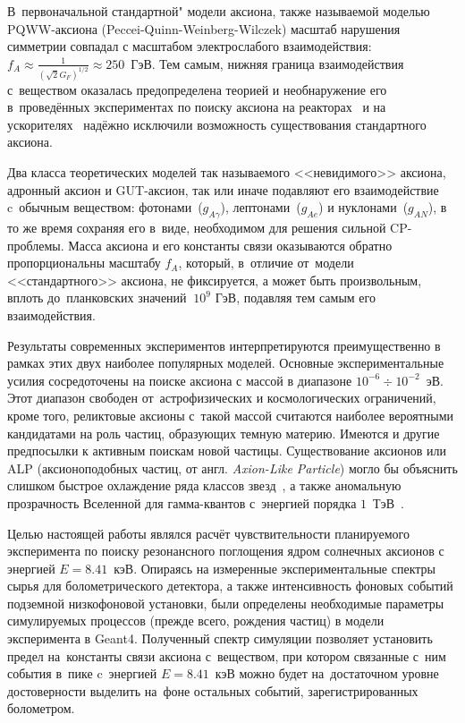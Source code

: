 \documentclass[a4paper,article,14pt]{extarticle}
\begin{document}
В~первоначальной стандартной" модели аксиона, также называемой моделью PQWW-аксиона (Peccei-Quinn-Weinberg-Wilczek) масштаб нарушения симметрии совпадал с масштабом электрослабого взаимодействия:
$f_A \approx \frac{1}{(\sqrt{2} G_F)^{1/2}} \approx 250$~ГэВ.
Тем самым, нижняя граница взаимодействия с~веществом оказалась предопределена теорией и необнаружение его в~проведённых экспериментах по поиску аксиона на реакторах~\cite{ReactorExperiment1,ReactorExperiment2} и на ускорителях~\cite{AcceleratorExperiment1,AcceleratorExperiment2} надёжно исключили возможность существования стандартного аксиона.

Два класса теоретических моделей так называемого <<невидимого>> аксиона, адронный аксион и GUT-аксион, так или иначе подавляют его взаимодействие c~обычным веществом: фотонами~($g_{A\gamma}$), лептонами~($g_{Ae}$) и нуклонами~($g_{AN}$), в то же время сохраняя его в~виде, необходимом для решения сильной CP-проблемы.
Масса аксиона и его константы связи оказываются обратно пропорциональны масштабу $f_A$, который, в~отличие от~модели <<стандартного>> аксиона, не фиксируется, а может быть произвольным, вплоть до~планковских значений $~10^9 \text{ ГэВ}$, подавляя тем самым его взаимодействия.

Результаты современных экспериментов интерпретируются преимущественно в рамках этих двух наиболее популярных моделей.
Основные экспериментальные усилия сосредоточены на поиске аксиона с массой в диапазоне $10^{-6} \div 10^{-2}$~эВ.
Этот диапазон свободен от~астрофизических и космологических ограничений, кроме того, реликтовые аксионы с~такой массой считаются наиболее вероятными кандидатами на роль частиц, образующих темную материю.
Имеются и другие предпосылки к активным поискам новой частицы.
Существование аксионов или ALP (аксионоподобных частиц, от англ. \textit{Axion-Like Particle}) могло бы объяснить слишком быстрое охлаждение ряда классов звезд~\cite{whitedwarfs}, а также аномальную прозрачность Вселенной для гамма-квантов с~энергией порядка $1$~ТэВ~\cite{transparency,transparency_axion}.

Целью настоящей работы являлся расчёт чувствительности планируемого эксперимента по поиску резонансного поглощения ядром {\Tm} солнечных аксионов с энергией $E = 8.41$~кэВ.
Опираясь на измеренные экспериментальные спектры сырья для болометрического детектора, а также интенсивность фоновых событий подземной низкофоновой установки, были определены необходимые параметры симулируемых процессов (прежде всего, рождения частиц) в модели эксперимента в Geant4.
Полученный спектр симуляции позволяет установить предел на~константы связи аксиона с~веществом, при котором связанные с~ним события в~пике c~энергией $E = 8.41$~кэВ можно будет на~достаточном уровне достоверности выделить на~фоне остальных событий, зарегистрированных болометром.
 
\end{document}
